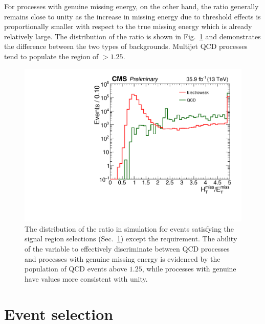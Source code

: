 For processes with genuine missing energy, on the other hand, the ratio 
generally remains close to unity as the increase in missing energy due to 
threshold effects is proportionally smaller with respect to the true missing 
energy which is already relatively large. The distribution of the \mhtmet 
ratio is shown in Fig.~\ref{fig:mhtmet} and demonstrates the difference between 
the two types of backgrounds. Multijet QCD processes tend to populate the 
region of \mhtmet$>1.25$.

\begin{figure}[t!]
\begin{center}
\includegraphics[width=0.7\linewidth]{figs/analysis/mhtmet_180306}
\caption{The distribution of the \mhtmet ratio in simulation for 
events satisfying the signal region selections 
(Sec.~\ref{sec:analysis-eventselection}) except the \mhtmet requirement. The 
ability of the variable to effectively discriminate between QCD processes and 
processes with genuine missing energy is evidenced by the population of QCD 
events above $1.25$, while processes with genuine \met have values more 
consistent with unity.}
\label{fig:mhtmet}
\end{center}
\end{figure}








\section{Event selection}
\label{sec:analysis-eventselection}


